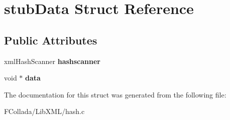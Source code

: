 \hypertarget{structstubData}{
\section{stubData Struct Reference}
\label{structstubData}
}
\subsection*{Public Attributes}
\begin{DoxyCompactItemize}
\item 
\hypertarget{structstubData_add9ffa78cce79fe7b76f56a720c44238}{
xmlHashScanner {\bfseries hashscanner}}
\label{structstubData_add9ffa78cce79fe7b76f56a720c44238}

\item 
\hypertarget{structstubData_af537ef18074e642c7a7d58de1a9e295f}{
void $\ast$ {\bfseries data}}
\label{structstubData_af537ef18074e642c7a7d58de1a9e295f}

\end{DoxyCompactItemize}


The documentation for this struct was generated from the following file:\begin{DoxyCompactItemize}
\item 
FCollada/LibXML/hash.c\end{DoxyCompactItemize}
